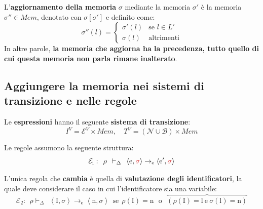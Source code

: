 \documentclass[a4paper]{article}
\begin{document}
 	L'\textbf{aggiornamento della memoria} $\sigma$ mediante la memoria $\sigma'$ è la memoria $\sigma''\in Mem$, denotato con $\sigma\left[\sigma'\right]$ e definito come:
 	\begin{equation*}
 		\sigma''\left(l\right) = \begin{cases}
 			\sigma'\left(l\right)	& \text{se } l \in L' \\
 			\sigma\left(l\right)	& \text{altrimenti}
 		\end{cases}
 	\end{equation*}
 	In altre parole, \textbf{la memoria che aggiorna ha la precedenza, tutto quello di cui questa memoria non parla rimane inalterato}.\newpage
 	
 	\subsection{Aggiungere la memoria nei sistemi di transizione e nelle regole}
 	
 	\begin{boxdef}
 		Le \textcolor{Red3}{\textbf{espressioni}} hanno il seguente \textbf{sistema di transizione}:
 		\begin{equation*}
 			I^{V} = \mathcal{E}^{V} \times Mem, \hspace{1em} T^{V} = \left(\mathcal{N} \cup \mathcal{B}\right) \times Mem
 		\end{equation*}
 	\end{boxdef}
 	
 	\noindent
 	Le regole assumono la seguente struttura:
	\begin{equation*}
		\mathcal{E}_{\mathrm{i}}: \:\: \rho \:\: \vdash_{\Delta} \:\: \left\langle \mathrm{e},\textcolor{Red3}{\sigma} \right\rangle \rightarrow_{\mathrm{e}} \left\langle \mathrm{e}', \textcolor{Red3}{\sigma} \right\rangle
	\end{equation*}
 
 	\noindent
 	L'unica regola che \textbf{cambia} è quella di \textbf{valutazione degli identificatori}, la quale deve considerare il caso in cui l'identificatore sia una variabile:
 	\begin{equation*}
 		\mathcal{E}_{2} : \:\: \rho\vdash_{\Delta} \:\: \left\langle \mathrm{I}, \sigma \right\rangle \rightarrow_{\mathrm{e}} \left\langle \mathrm{n}, \sigma \right\rangle \:\: \mathrm{se} \:\: \rho\left(\mathrm{I}\right) = \mathrm{n} \:\:\: \mathrm{o} \:\:\: \overbrace{\left(\rho\left(\mathrm{I}\right) = \mathrm{l} \: \mathrm{e} \: \sigma\left(\mathrm{l}\right) = \mathrm{n}\right)}
 	\end{equation*}
 	
\end{document}
